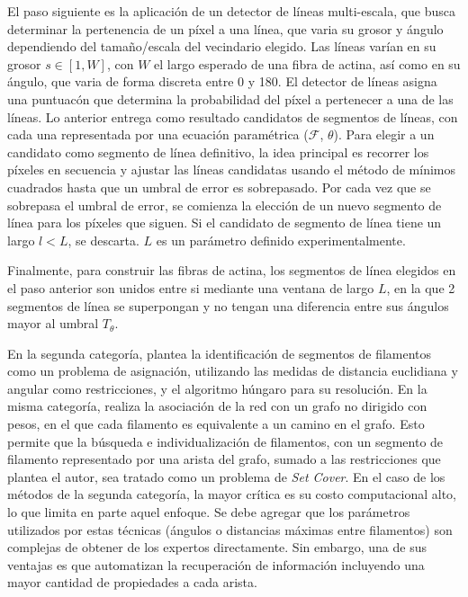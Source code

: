 El paso siguiente es la aplicaci\'on de un detector de l\'ineas multi-escala, que busca determinar la pertenencia de un p\'ixel a una l\'inea, que varia su grosor y \'angulo dependiendo del tama\~no/escala del vecindario elegido. Las l\'ineas var\'ian en su grosor $s \in [1,W]$, con $W$ el largo esperado de una fibra de actina, as\'i como en su \'angulo, que varia de forma discreta entre 0 y 180\textdegree. El detector de l\'ineas asigna una puntuac\'on que determina la probabilidad del p\'ixel a pertenecer a una de las l\'ineas. Lo anterior entrega como resultado candidatos de segmentos de l\'ineas, con cada una representada por una ecuaci\'on param\'etrica ($\mathcal{F}$, $\theta$). Para elegir a un candidato como segmento de l\'inea definitivo, la idea principal es recorrer los p\'ixeles en secuencia y ajustar las l\'ineas candidatas usando el m\'etodo de m\'inimos cuadrados hasta que un umbral de error es sobrepasado. Por cada vez que se sobrepasa el umbral de error, se comienza la elecci\'on de un nuevo segmento de l\'inea para los p\'ixeles que siguen. Si el candidato de segmento de l\'inea tiene un largo $l < L$, se descarta. $L$ es un par\'ametro definido experimentalmente.

Finalmente, para construir las fibras de actina, los segmentos de l\'inea elegidos en el paso anterior son unidos entre si mediante una ventana de largo $L$, en la que 2 segmentos de l\'inea se superpongan y no tengan una diferencia entre sus \'angulos mayor al umbral $T_{\theta}$. 



\smallskip
En la segunda categor\'ia, \cite{cerda2014geometrical} plantea la identificaci\'on de segmentos de filamentos como un problema de asignaci\'on, utilizando las medidas de distancia euclidiana y angular como restricciones, y el algoritmo h\'ungaro para su resoluci\'on. En la misma categor\'ia, \cite{breuer2015define} realiza la asociaci\'on de la red con un grafo no dirigido con pesos, en el que cada filamento es equivalente a un camino en el grafo. Esto permite que la b\'usqueda e individualizaci\'on de filamentos, con un segmento de filamento representado por una arista del grafo, sumado a las restricciones que plantea el autor, sea tratado como un problema de {\it Set Cover}. En el caso de los m\'etodos de la segunda categor\'ia, la mayor cr\'itica es su costo computacional alto, lo que limita en parte aquel enfoque. Se debe agregar que los par\'ametros utilizados por estas t\'ecnicas (\'angulos o  distancias m\'aximas entre filamentos) son complejas de obtener de los expertos directamente. Sin embargo, una de sus ventajas es que automatizan la recuperaci\'on de informaci\'on incluyendo una mayor cantidad de propiedades a cada arista. 


